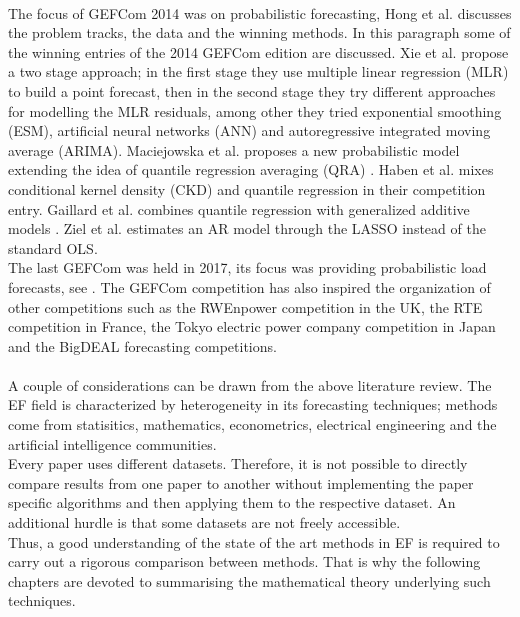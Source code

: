 \\
The focus of GEFCom 2014 was on probabilistic forecasting, Hong et al. \cite{hong2016probabilistic} discusses the problem tracks, the data and the winning methods.
In this paragraph some of the winning entries of the 2014 GEFCom edition are discussed.
Xie et al. \cite{xie2016gefcom2014} propose a two stage approach; in the first stage they use multiple linear regression (MLR) to build a point forecast, then in the second stage they try different approaches for modelling the MLR residuals, among other they tried exponential smoothing (ESM), artificial neural networks (ANN) and autoregressive integrated moving average (ARIMA). 
Maciejowska et al. \cite{maciejowska2016hybrid} proposes a new probabilistic model extending the idea of quantile regression averaging (QRA) \cite{nowotarski2015computing}.
Haben et al. \cite{haben2016hybrid} mixes conditional kernel density (CKD) and quantile regression in their competition entry.
Gaillard et al. \cite{gaillard2016additive,gaillardasemi} combines quantile regression with generalized additive models \cite{hastie2017generalized}.
Ziel et al. \cite{ziel2016lasso} estimates an AR model through the LASSO \cite{tibshirani1996regression} instead of the standard OLS.
\\
The last GEFCom was held in 2017, its focus was providing probabilistic load forecasts, see \cite{hong2019global}. The GEFCom competition has also inspired the organization of other competitions such as the RWEnpower competition in the UK, the RTE competition in France, the Tokyo electric power company competition in Japan and the BigDEAL forecasting competitions.
\\
\\
A couple of considerations can be drawn from the above literature review.
The EF field is characterized by heterogeneity in its forecasting techniques; methods come from statisitics, mathematics, econometrics, electrical engineering and the artificial intelligence communities.
\\
Every paper uses different datasets.
Therefore, it is not possible to directly compare results from one paper to another without implementing the paper specific algorithms and then applying them to the respective dataset. An additional hurdle is that some datasets are not freely accessible.
\\
Thus, a good understanding of the state of the art methods in EF is required to carry out a rigorous comparison between methods.
That is why the following chapters are devoted to summarising the mathematical theory underlying such techniques.


